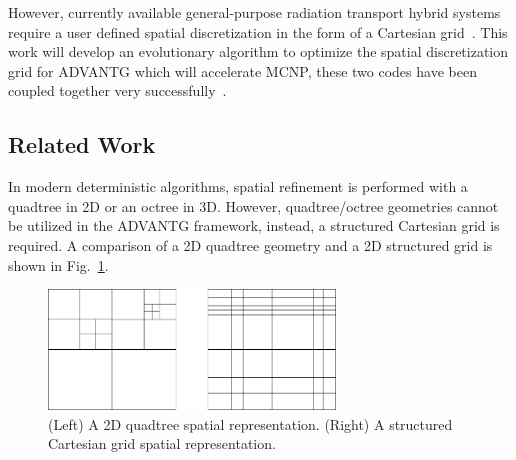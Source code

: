 \documentclass{article}
\begin{document}
However, currently available general-purpose radiation transport hybrid systems require a user defined spatial discretization in the form of a Cartesian grid~\cite{ref:Wagner2014, ref:Mosher2015}. This work will develop an evolutionary algorithm to optimize the spatial discretization grid for ADVANTG which will accelerate MCNP, these two codes have been coupled together very successfully~\cite{ref:Blakeman2007, ref:Risner2013, ref:Ibrahim2011, ref:Wagner2011}.



\subsection{Related Work}\label{sec:b2}
In modern deterministic algorithms, spatial refinement is performed with a quadtree in 2D or an octree in 3D. However, quadtree/octree geometries cannot be utilized in the ADVANTG framework, instead, a structured Cartesian grid is required. A comparison of a 2D quadtree geometry and a 2D structured grid is shown in Fig.~\ref{fig:treecomp}. 

\begin{figure}
    \centering
    \includegraphics[width=3.0in]{treecomp}
    \caption{(Left) A 2D quadtree spatial representation. (Right) A structured Cartesian grid spatial representation.}
    \label{fig:treecomp}
\end{figure}
\end{document}
